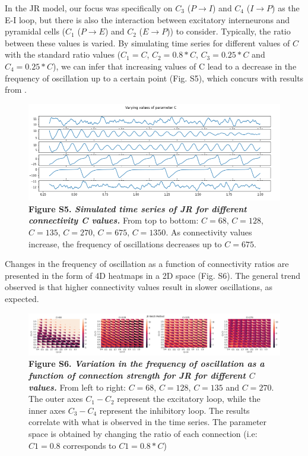 \documentclass[12pt,twoside]{article}
\begin{document}
In the JR model, our focus was specifically on $C_{3}$ ($P \rightarrow I$) and $C_{4}$ ($I \rightarrow P$) as the E-I loop, but there is also the interaction between excitatory interneurons and pyramidal cells ($C_{1}$ ($P \rightarrow E$) and $C_{2}$ ($E \rightarrow P$)) to consider. Typically, the ratio between these values is varied. By simulating time series for different values of $C$ with the standard ratio values ($C_{1}=C$, $C_{2}=0.8*C$, $C_{3}=0.25*C$ and $C_{4}=0.25*C$), we can infer that increasing values of C lead to a decrease in the frequency of oscillation up to a certain point (Fig. S5), which concurs with results from \citet{jansen1995electroencephalogram}. \\

\begin{figure}[H]
    \centering
    \includegraphics[scale=0.75]{Images/JR_Varying_C_time_series.png}
    \caption*{\textbf{Figure S5.  \textit{Simulated time series of JR for different connectivity C values.}} From top to bottom: $C= 68$, $C=128$, $C=135$, $C=270$, $C=675$, $C=1350$. As connectivity values increase, the frequency of oscillations decreases up to $C=675$.}    
    \label{fig:JR_Ctime}
\end{figure}

Changes in the frequency of oscillation as a function of connectivity ratios are presented in the form of 4D heatmaps in a 2D space (Fig. S6). The general trend observed is that higher connectivity values result in slower oscillations, as expected. 



\begin{figure}[H]
    \hspace{-1cm}
    \includegraphics[scale=0.60]{Images/JR_Connection_2png_new.png}
    \caption*{\textbf{Figure S6.  \textit{Variation in  the frequency of oscillation as a function of connection strength for JR for different $C$ values.}} From left to right: $C=68$, $C=128$, $C=135$ and $C=270$. The outer axes $C_{1}-C_{2}$ represent the excitatory loop, while the inner axes $C_{3}-C_{4}$ represent the inhibitory loop. The results correlate with what is observed in the time series. The parameter space is obtained by changing the ratio of each connection (i.e: $C1 = 0.8$ corresponds to $C1 = 0.8*C$)}       
    \label{fig:JR_Cconnection}
\end{figure}
\end{document}
